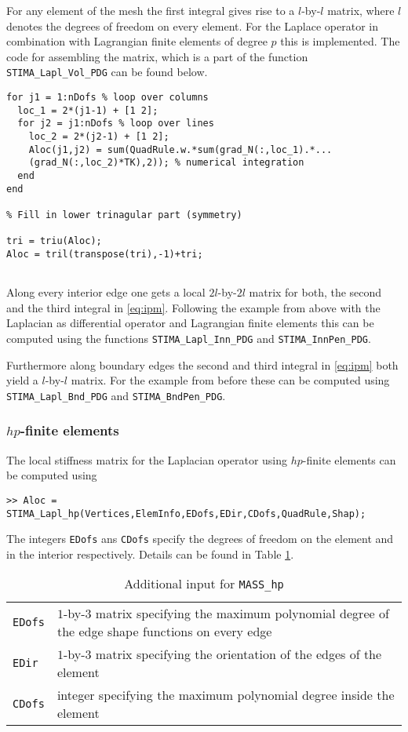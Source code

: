  For any element of the mesh the first integral gives rise to a $l$-by-$l$ matrix, where $l$ denotes the degrees of freedom on every element. For the Laplace operator in combination with Lagrangian finite elements of degree $p$ this is implemented. The code for assembling the matrix, which is a part of the function {\tt STIMA\_Lapl\_Vol\_PDG} can be found below.
  
\begin{lstlisting}
for j1 = 1:nDofs % loop over columns
  loc_1 = 2*(j1-1) + [1 2];
  for j2 = j1:nDofs % loop over lines
    loc_2 = 2*(j2-1) + [1 2];
    Aloc(j1,j2) = sum(QuadRule.w.*sum(grad_N(:,loc_1).*...
	(grad_N(:,loc_2)*TK),2)); % numerical integration
  end
end

% Fill in lower trinagular part (symmetry)
    
tri = triu(Aloc);
Aloc = tril(transpose(tri),-1)+tri;
  
\end{lstlisting}

Along every interior edge one gets a local $2l$-by-$2l$ matrix for both, the second and the third integral in \eqref{eq:ipm}. Following the example from above with the Laplacian as differential operator and Lagrangian finite elements this can be computed using the functions {\tt STIMA\_Lapl\_Inn\_PDG} and {\tt STIMA\_InnPen\_PDG}.

Furthermore along boundary edges the second and third integral in \eqref{eq:ipm} both yield a $l$-by-$l$ matrix. For the example from before these can be computed using {\tt STIMA\_Lapl\_Bnd\_PDG} and {\tt STIMA\_BndPen\_PDG}.
 
 
 \subsubsection{$hp$-finite elements}
 
 The local stiffness matrix for the Laplacian operator using $hp$-finite elements can be computed using
 
 \noindent \verb!>> Aloc = STIMA_Lapl_hp(Vertices,ElemInfo,EDofs,EDir,CDofs,QuadRule,Shap);!
 
 The integers {\tt EDofs} ans {\tt CDofs} specify the degrees of freedom on the element and in the interior respectively. Details can be found in Table \ref{tab:mass_hp}.
 
 \begin{table}[htb]
  \begin{tabular}{p{1.5cm}p{9.5cm}}
	{\tt EDofs}\index{EDofs@{\tt EDofs}} & {\small $1$-by-$3$ matrix specifying the maximum polynomial degree of the edge shape functions on every edge} \\
	{\tt EDir}\index{EDir@{\tt EDir}} & {\small $1$-by-$3$ matrix specifying the orientation of the edges of the element} \\
	{\tt CDofs}\index{CDofs@{\tt CDofs}} & {\small integer specifying the maximum polynomial degree inside the element}
  \end{tabular}
  \caption{Additional input for {\tt MASS\_hp}}
  \label{tab:mass_hp}
\end{table}

